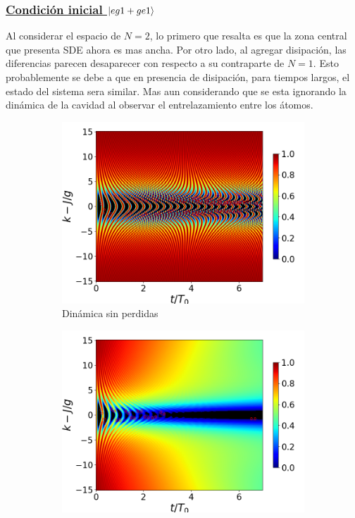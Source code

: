 \subsubsection{\underline{Condición inicial $\ket{eg1+ge1}$}}
Al considerar el espacio de $N=2$, lo primero que resalta es que la zona central que presenta SDE ahora es mas ancha. Por otro lado, al agregar disipación, las diferencias parecen desaparecer con respecto a su contraparte de $N=1$. Esto probablemente se debe a que en presencia de disipación, para tiempos largos, el estado del sistema sera similar. Mas aun considerando que se esta ignorando la dinámica de la cavidad al observar el entrelazamiento entre los átomos.
\begin{figure}[h!]
    \centering
    \begin{subfigure}{0.49\textwidth}
        \includegraphics[width=\textwidth]{figuras/ch4/concu/k/eg1+ge1 d=0.0g x=0.0g J=15.0g gamma=0.25g concu k uni.png}
        \caption{Dinámica sin perdidas}
        \label{fig4:concu k 1 uni}
    \end{subfigure}
    \hfill
    \begin{subfigure}{0.49\textwidth}
        \includegraphics[width=\textwidth]{figuras/ch4/concu/k/eg1+ge1 d=0.0g x=0.0g J=15.0g gamma=0.25g concu k dis.png}

\end{subfigure}
\end{figure}

